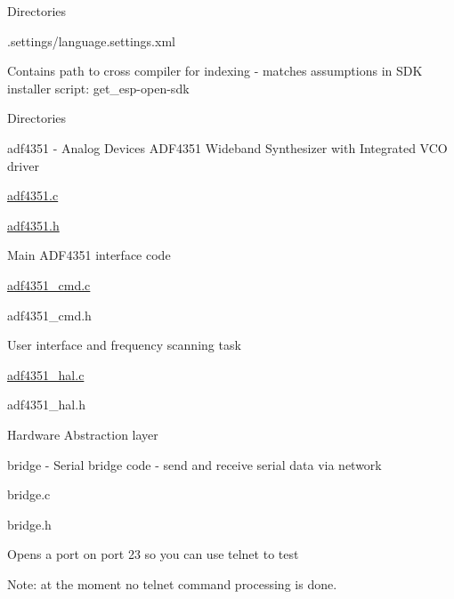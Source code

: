 \begin{DoxyParagraph}{Directories}
\begin{DoxyItemize}
\begin{DoxyItemize}
\begin{DoxyItemize}
\item .settings/language.\+settings.\+xml
\begin{DoxyItemize}
\item Contains path to cross compiler for indexing -\/ matches assumptions in S\+DK installer script\+: get\+\_\+esp-\/open-\/sdk
\end{DoxyItemize}
\end{DoxyItemize}
\end{DoxyItemize}
\item Directories
\begin{DoxyItemize}
\item adf4351 -\/ Analog Devices A\+D\+F4351 Wideband Synthesizer with Integrated V\+CO driver
\begin{DoxyItemize}
\item \hyperlink{adf4351_8c}{adf4351.\+c}
\item \hyperlink{adf4351_8h}{adf4351.\+h}
\begin{DoxyItemize}
\item Main A\+D\+F4351 interface code
\end{DoxyItemize}
\item \hyperlink{adf4351__cmd_8c}{adf4351\+\_\+cmd.\+c}
\item adf4351\+\_\+cmd.\+h
\begin{DoxyItemize}
\item User interface and frequency scanning task
\end{DoxyItemize}
\item \hyperlink{adf4351__hal_8c}{adf4351\+\_\+hal.\+c}
\item adf4351\+\_\+hal.\+h
\begin{DoxyItemize}
\item Hardware Abstraction layer
\end{DoxyItemize}
\end{DoxyItemize}
\item bridge -\/ Serial bridge code -\/ send and receive serial data via network
\begin{DoxyItemize}
\item bridge.\+c
\item bridge.\+h
\begin{DoxyItemize}
\item Opens a port on port 23 so you can use telnet to test
\begin{DoxyItemize}
\item Note\+: at the moment no telnet command processing is done.
\end{DoxyItemize}
\end{DoxyItemize}
\end{DoxyItemize}
\end{DoxyItemize}
\end{DoxyItemize}
\end{DoxyParagraph}

